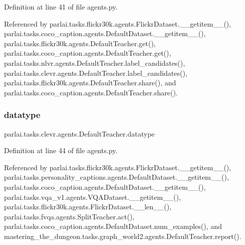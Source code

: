 Definition at line 41 of file agents.\+py.



Referenced by parlai.\+tasks.\+flickr30k.\+agents.\+Flickr\+Dataset.\+\_\+\+\_\+getitem\+\_\+\+\_\+(), parlai.\+tasks.\+coco\+\_\+caption.\+agents.\+Default\+Dataset.\+\_\+\+\_\+getitem\+\_\+\+\_\+(), parlai.\+tasks.\+flickr30k.\+agents.\+Default\+Teacher.\+get(), parlai.\+tasks.\+coco\+\_\+caption.\+agents.\+Default\+Teacher.\+get(), parlai.\+tasks.\+nlvr.\+agents.\+Default\+Teacher.\+label\+\_\+candidates(), parlai.\+tasks.\+clevr.\+agents.\+Default\+Teacher.\+label\+\_\+candidates(), parlai.\+tasks.\+flickr30k.\+agents.\+Default\+Teacher.\+share(), and parlai.\+tasks.\+coco\+\_\+caption.\+agents.\+Default\+Teacher.\+share().

\mbox{\label{classparlai_1_1tasks_1_1clevr_1_1agents_1_1DefaultTeacher_a7bdb21c7cb0d04c3470c069125ea3d4a}} 
\subsubsection{\texorpdfstring{datatype}{datatype}}
{\footnotesize\ttfamily parlai.\+tasks.\+clevr.\+agents.\+Default\+Teacher.\+datatype}



Definition at line 44 of file agents.\+py.



Referenced by parlai.\+tasks.\+flickr30k.\+agents.\+Flickr\+Dataset.\+\_\+\+\_\+getitem\+\_\+\+\_\+(), parlai.\+tasks.\+personality\+\_\+captions.\+agents.\+Default\+Dataset.\+\_\+\+\_\+getitem\+\_\+\+\_\+(), parlai.\+tasks.\+coco\+\_\+caption.\+agents.\+Default\+Dataset.\+\_\+\+\_\+getitem\+\_\+\+\_\+(), parlai.\+tasks.\+vqa\+\_\+v1.\+agents.\+V\+Q\+A\+Dataset.\+\_\+\+\_\+getitem\+\_\+\+\_\+(), parlai.\+tasks.\+flickr30k.\+agents.\+Flickr\+Dataset.\+\_\+\+\_\+len\+\_\+\+\_\+(), parlai.\+tasks.\+fvqa.\+agents.\+Split\+Teacher.\+act(), parlai.\+tasks.\+coco\+\_\+caption.\+agents.\+Default\+Dataset.\+num\+\_\+examples(), and mastering\+\_\+the\+\_\+dungeon.\+tasks.\+graph\+\_\+world2.\+agents.\+Default\+Teacher.\+report().

\mbox{\label{classparlai_1_1tasks_1_1clevr_1_1agents_1_1DefaultTeacher_ab936a3d7fc5e5249495d9a42a30d0708}} 
